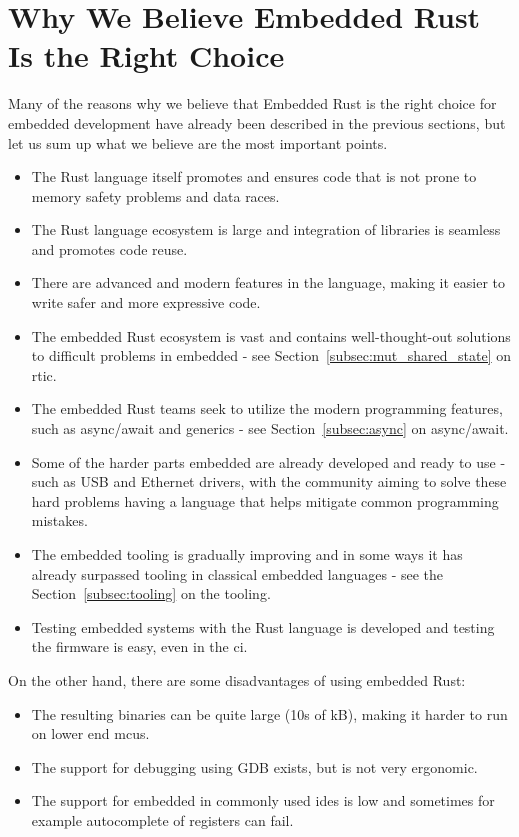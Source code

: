 \section{Why We Believe Embedded Rust Is the Right Choice}
\label{sec:embedded_rust_reasoning}
Many of the reasons why we believe that Embedded Rust is the right choice for embedded development have already been described in the previous sections, but let us sum up what we believe are the most important points.
\begin{itemize}
    \item The Rust language itself promotes and ensures code that is not prone to memory safety problems and data races.
    \item The Rust language ecosystem is large and integration of libraries is seamless and promotes code reuse.
    \item There are advanced and modern features in the language, making it easier to write safer and more expressive code.
    \item The embedded Rust ecosystem is vast and contains well-thought-out solutions to difficult problems in embedded - see Section~\ref{subsec:mut_shared_state} on \acs{rtic}.
    \item The embedded Rust teams seek to utilize the modern programming features, such as async/await and generics - see Section~\ref{subsec:async} on async/await.
    \item Some of the harder parts embedded are already developed and ready to use - such as USB and Ethernet drivers, with the community aiming to solve these hard problems having a language that helps mitigate common programming mistakes.
    \item The embedded tooling is gradually improving and in some ways it has already surpassed tooling in classical embedded languages - see the Section~\ref{subsec:tooling} on the tooling.
    \item Testing embedded systems with the Rust language is developed and testing the firmware is easy, even in the \acs{ci}.
\end{itemize}

On the other hand, there are some disadvantages of using embedded Rust:
\begin{itemize}
    \item The resulting binaries can be quite large (10s of kB), making it harder to run on lower end \acs{mcu}s.
    \item The support for debugging using GDB exists, but is not very ergonomic.
    \item The support for embedded in commonly used \acs{ide}s is low and sometimes for example autocomplete of registers can fail.
\end{itemize}
